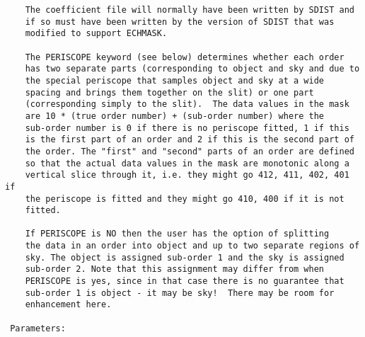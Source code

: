 \begin{description}
\begin{verbatim}
    The coefficient file will normally have been written by SDIST and
    if so must have been written by the version of SDIST that was
    modified to support ECHMASK.

    The PERISCOPE keyword (see below) determines whether each order
    has two separate parts (corresponding to object and sky and due to
    the special periscope that samples object and sky at a wide
    spacing and brings them together on the slit) or one part
    (corresponding simply to the slit).  The data values in the mask
    are 10 * (true order number) + (sub-order number) where the
    sub-order number is 0 if there is no periscope fitted, 1 if this
    is the first part of an order and 2 if this is the second part of
    the order. The "first" and "second" parts of an order are defined
    so that the actual data values in the mask are monotonic along a
    vertical slice through it, i.e. they might go 412, 411, 402, 401 if
    the periscope is fitted and they might go 410, 400 if it is not
    fitted.

    If PERISCOPE is NO then the user has the option of splitting
    the data in an order into object and up to two separate regions of
    sky. The object is assigned sub-order 1 and the sky is assigned
    sub-order 2. Note that this assignment may differ from when
    PERISCOPE is yes, since in that case there is no guarantee that
    sub-order 1 is object - it may be sky!  There may be room for
    enhancement here.

 Parameters:


\end{verbatim}
\end{description}
